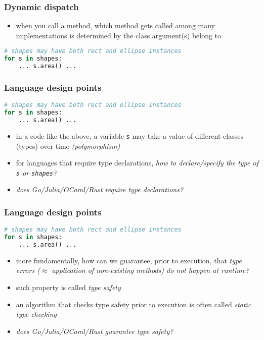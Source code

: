 \documentclass[12pt,dvipdfmx]{beamer}
\newcommand{\ao}[1]{{\color{blue}#1}}
\begin{document}
\begin{frame}[fragile]
  \frametitle{Dynamic dispatch}
  \begin{itemize}
  \item when you call a method, which method gets called among many implementations is determined by the class argument(s) belong to
  \end{itemize}

\begin{center}
\begin{lstlisting}[language=python]
# shapes may have both rect and ellipse instances
for s in shapes:
    ... s.area() ...
\end{lstlisting}
\end{center}
  
\end{frame}

\begin{frame}[fragile]
  \frametitle{Language design points}
\begin{center}
\begin{lstlisting}[language=python]
# shapes may have both rect and ellipse instances
for s in shapes:
    ... s.area() ...
\end{lstlisting}
\end{center}
  
  \begin{itemize}
  \item in a code like the above, a variable {\tt s} may take a value of different classes (types) over time \ao{\it (polymorphism)}
  \item for languages that require type declarations,
    {\it how to declare/specify the type of {\tt s} or {\tt shapes}?}
  \item {\it does Go/Julia/OCaml/Rust require type declarations?}
  \end{itemize}
\end{frame}

\begin{frame}[fragile]
  \frametitle{Language design points}
\begin{center}
\begin{lstlisting}[language=python]
# shapes may have both rect and ellipse instances
for s in shapes:
    ... s.area() ...
\end{lstlisting}
\end{center}
  \begin{itemize}
  \item more fundamentally, how can we guarantee, prior to execution,
      that \ao{\it type errors ($\approx$ application of non-existing methods)
      do not happen at runtime?}
  \item such property is called \ao{\it type safety}
  \item an algorithm that checks type safety
    prior to execution is often called
    \ao{\it static type checking}
    
  \item \ao{\it does Go/Julia/OCaml/Rust guarantee type safety?}
  \end{itemize}
\end{frame}
\end{document}
